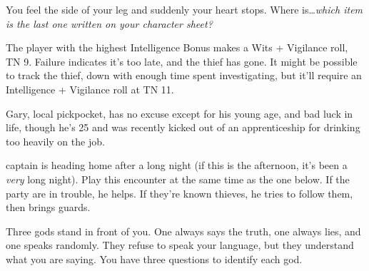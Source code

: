 \begin{multicols}{2}

\resumecontents[town]

\label{randommeetings}

\startcontents[sq]

\sqminitoc


\begin{boxtext}

	You feel the side of your leg and suddenly your heart stops.  Where is\ldots \textit{which item is the last one written on your character sheet?}

\end{boxtext}

The player with the highest Intelligence Bonus makes a Wits + Vigilance roll, TN 9.  Failure indicates it's too late, and the thief has gone.  It might be possible to track the thief, down with enough time spent investigating, but it'll require an Intelligence + Vigilance roll at TN 11.

Gary, local pickpocket, has no excuse except for his young age, and bad luck in life, though he's 25 and was recently kicked out of an apprenticeship for drinking too heavily on the job.

\humanthief



\Gls{captain} is heading home after a long night (if this is the afternoon, it's been a \emph{very} long night).  Play this encounter at the same time as the one below.  If the party are in trouble, he helps.  If they're known thieves, he tries to follow them, then brings guards.



\begin{boxtext}
Three gods stand in front of you.  One always says the truth, one always lies, and one speaks randomly.  They refuse to speak your language, but they understand what you are saying.  You have three questions to identify each god.
\end{boxtext}


\end{multicols}
